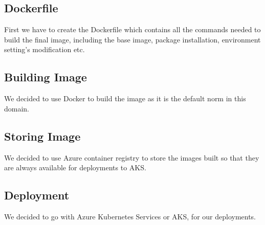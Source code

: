 \subsection{Dockerfile}
First we have to create the Dockerfile which contains all the commands needed to build the final image, including the base image, package installation, environment setting's modification etc.

\subsection{Building Image}
We decided to use Docker to build the image as it is the default norm in this domain.

\subsection{Storing Image}
We decided to use Azure container registry to store the images built so that they are always available for deployments to AKS.

\subsection{Deployment}
We decided to go with Azure Kubernetes Services or AKS, for our deployments.
